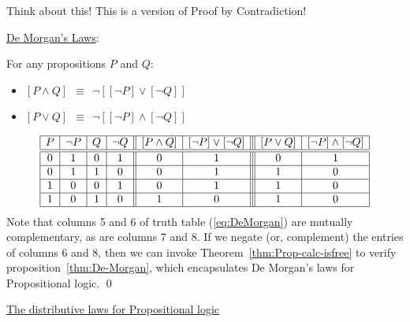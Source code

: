 \smallskip

\noindent
Think about this!  This is a version of Proof by Contradiction!

\bigskip

\noindent 
\underline{\small\sf De Morgan's Laws}:

\begin{prop}
\label{thm:De-Morgan}
For any propositions $P$ and $Q$:
\begin{itemize}
\item
$[ P \wedge Q ] \ \ \equiv \ \ \neg [ [\neg P] \vee [\neg Q]]$
\medskip\item
$[ P \vee Q ] \ \ \equiv \ \ \neg [ [\neg P] \wedge [\neg Q]]$
\end{itemize}
\end{prop}

\begin{equation}
\label{eq:DeMorgan}
\begin{array}{|c|c|c|c||c|c|||c|c|}
\hline
P & \neg P & Q & \neg Q 
  & [ P \wedge Q ]
  & [\neg P] \vee [\neg Q]
  & [ P \vee Q ]
  & [\neg P] \wedge [\neg Q] \\
\hline
\hline
0 & 1 & 0 & 1
  & 0
  & 1
  & 0
  & 1 \\
\hline
0 & 1 & 1 & 0
  & 0
  & 1
  & 1
  & 0 \\
\hline
1 & 0 & 0 & 1
  & 0
  & 1
  & 1
  & 0 \\
\hline
1 & 0 & 1 & 0
  & 1
  & 0
  & 1
  & 0 \\
\hline
\end{array}
\end{equation}
Note that columns 5 and 6 of truth table (\ref{eq:DeMorgan}) are mutually complementary, as are columns 7 and 8.  If we negate (or, complement) the entries of columns 6 and 8, then we can invoke Theorem~\ref{thm:Prop-calc-isfree} to verify proposition~\ref{thm:De-Morgan}, which encapsulates De Morgan's laws for Propositional logic.  \qed

\medskip

\noindent 
\underline{\small\sf The distributive laws for Propositional logic}

\smallskip

